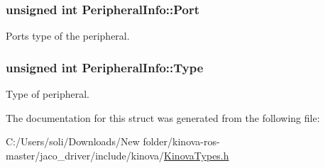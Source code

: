\subsubsection[{\texorpdfstring{Port}{Port}}]{\setlength{\rightskip}{0pt plus 5cm}unsigned int Peripheral\+Info\+::\+Port}\hypertarget{struct_peripheral_info_acf5f236a5c5c7923edd5175ac00ae3c5}{}\label{struct_peripheral_info_acf5f236a5c5c7923edd5175ac00ae3c5}


Port\textquotesingle{}s type of the peripheral. 

\subsubsection[{\texorpdfstring{Type}{Type}}]{\setlength{\rightskip}{0pt plus 5cm}unsigned int Peripheral\+Info\+::\+Type}\hypertarget{struct_peripheral_info_a68ed2672dbb345ad711011834439be4e}{}\label{struct_peripheral_info_a68ed2672dbb345ad711011834439be4e}


Type of peripheral. 



The documentation for this struct was generated from the following file\+:\begin{DoxyCompactItemize}
\item 
C\+:/\+Users/soli/\+Downloads/\+New folder/kinova-\/ros-\/master/jaco\+\_\+driver/include/kinova/\hyperlink{_kinova_types_8h}{Kinova\+Types.\+h}\end{DoxyCompactItemize}
